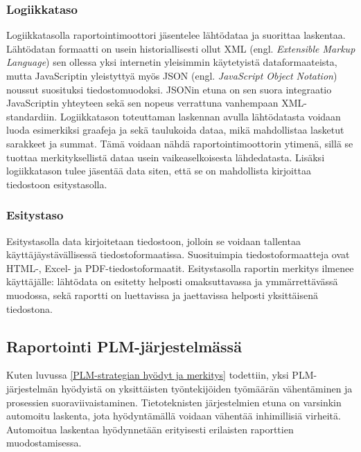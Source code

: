 \subsubsection{Logiikkataso}

Logiikkatasolla raportointimoottori jäsentelee lähtödataa ja suorittaa laskentaa. Lähtödatan formaatti on usein historiallisesti ollut XML (engl. \textit{Extensible Markup Language}) sen ollessa yksi internetin yleisimmin käytetyistä dataformaateista, mutta JavaScriptin yleistyttyä myös JSON (engl. \textit{JavaScript Object Notation}) noussut suosituksi tiedostomuodoksi. JSONin etuna on sen suora integraatio JavaScriptin yhteyteen sekä sen nopeus verrattuna vanhempaan XML-standardiin. \cite{nurseitov_comparison_nodate} Logiikkatason toteuttaman laskennan avulla lähtödatasta voidaan luoda esimerkiksi graafeja ja sekä taulukoida dataa, mikä mahdollistaa lasketut sarakkeet ja summat. Tämä voidaan nähdä raportointimoottorin ytimenä, sillä se tuottaa merkityksellistä dataa usein vaikeaselkoisesta lähdedatasta. \cite{he_design_2010} Lisäksi logiikkatason tulee jäsentää data siten, että se on mahdollista kirjoittaa tiedostoon esitystasolla.

\subsubsection{Esitystaso}

Esitystasolla data kirjoitetaan tiedostoon, jolloin se voidaan tallentaa käyttäjäystävällisessä tiedostoformaatissa. \cite{he_design_2010} Suosituimpia tiedostoformaatteja ovat HTML-, Excel- ja PDF-tiedostoformaatit. \cite{he_design_2010} Esitystasolla raportin merkitys ilmenee käyttäjälle: lähtödata on esitetty helposti omaksuttavassa ja ymmärrettävässä muodossa, sekä raportti on luettavissa ja jaettavissa helposti yksittäisenä tiedostona.

\subsection{Raportointi PLM-järjestelmässä} \label{Raportointi PLM-järjestelmässä}

Kuten luvussa \ref{PLM-strategian hyödyt ja merkitys} todettiin, yksi PLM-järjestelmän hyödyistä on yksittäisten työntekijöiden työmäärän vähentäminen ja prosessien suoraviivaistaminen. Tietoteknisten järjestelmien etuna on varsinkin automoitu laskenta, jota hyödyntämällä voidaan vähentää inhimillisiä virheitä. \cite{niu_organizational_2021} \cite{rakovic_digital_2022} Automoitua laskentaa hyödynnetään erityisesti erilaisten raporttien muodostamisessa.

